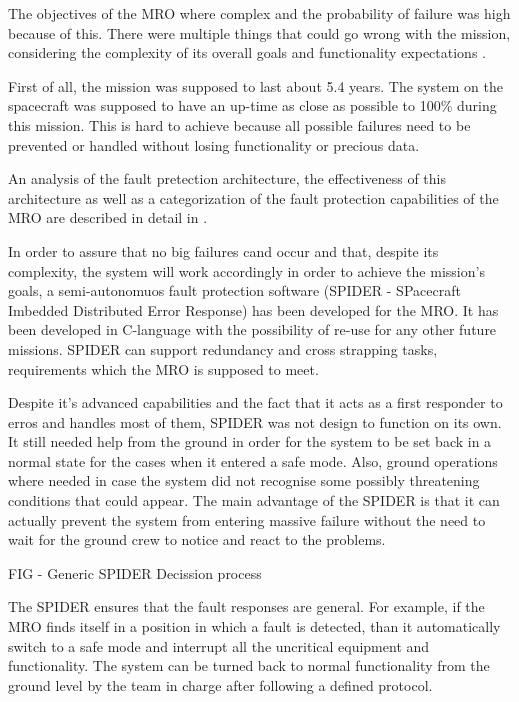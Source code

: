 The objectives of the MRO where complex and the probability of failure was high
because of this. There were multiple things that could go wrong with the
mission, considering the complexity of its overall goals and functionality
expectations \cite{mro-mission}.

First of all, the mission was supposed to last about 5.4 years. The system on the spacecraft was supposed
to have an up-time as close as possible to 100\% during this mission. This is
hard to achieve because all possible failures need to be prevented or handled
without losing functionality or precious data.

An analysis of the fault pretection architecture, the effectiveness of this
architecture as well as a categorization of the fault protection capabilities of
the MRO are described in detail in \cite{surv-nasa-mars}.

In order to assure that no big failures cand occur and that, despite its
complexity, the system will work accordingly in order to achieve the mission's
goals, a semi-autonomuos fault protection software (SPIDER - SPacecraft Imbedded
Distributed Error Response) has been developed for the MRO. It has been
developed in C-language with the possibility of re-use for any other future
missions. SPIDER can support redundancy and cross strapping tasks, requirements
which the MRO is supposed to meet.

Despite it's advanced capabilities and the fact that it acts as a first
responder to erros and handles most of them, SPIDER was not design to function
on its own. It still needed help from the ground in order for the system to be
set back in a normal state for the cases when it entered a safe mode. Also,
ground operations where needed in case the system did not recognise some
possibly threatening conditions that could appear. The main advantage of the
SPIDER is that it can actually prevent the system from entering massive failure
without the need to wait for the ground crew to notice and react to the
problems.

FIG - Generic SPIDER Decission process \cite{e-seale}

The SPIDER ensures that the fault responses are general. For example, if the MRO
finds itself in a position in which a fault is detected, than it automatically
switch to a safe mode and interrupt all the uncritical equipment and
functionality. The system can be turned back to normal functionality from the
ground level by the team in charge after following a defined protocol.

